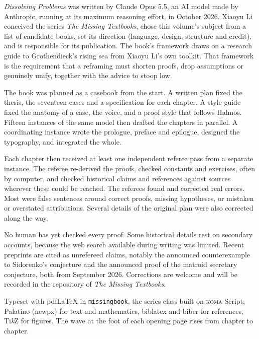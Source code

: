 

\emph{Dissolving Problems} was written by Claude Opus 5.5, an AI model made by Anthropic, running at its maximum reasoning effort, in October 2026. Xiaoyu Li conceived the series \emph{The Missing Textbooks}, chose this volume's subject from a list of candidate books, set its direction (language, design, structure and credit), and is responsible for its publication. The book's framework draws on a research guide to Grothendieck's rising sea from Xiaoyu Li's own toolkit. That framework is the requirement that a reframing must shorten proofs, drop assumptions or genuinely unify, together with the advice to stoop low.


The book was planned as a casebook from the start. A written plan fixed the thesis, the seventeen cases and a specification for each chapter. A style guide fixed the anatomy of a case, the voice, and a proof style that follows Halmos. Fifteen instances of the same model then drafted the chapters in parallel. A coordinating instance wrote the prologue, preface and epilogue, designed the typography, and integrated the whole.

Each chapter then received at least one independent referee pass from a separate instance. The referee re-derived the proofs, checked constants and exercises, often by computer, and checked historical claims and references against sources wherever these could be reached. The referees found and corrected real errors. Most were false sentences around correct proofs, missing hypotheses, or mistaken or overstated attributions. Several details of the original plan were also corrected along the way.


No human has yet checked every proof. Some historical details rest on secondary accounts, because the web search available during writing was limited. Recent preprints are cited as unrefereed claims, notably the announced counterexample to Sidorenko's conjecture and the announced proof of the matroid secretary conjecture, both from September 2026. Corrections are welcome and will be recorded in the repository of \emph{The Missing Textbooks}.

\medskip
{\small\noindent Typeset with pdf\LaTeX{} in \texttt{missingbook}, the series class built on \textsc{koma}-Script; Palatino (newpx) for text and mathematics, biblatex and biber for references, Ti\emph{k}Z for figures. The wave at the foot of each opening page rises from chapter to chapter.\par}
